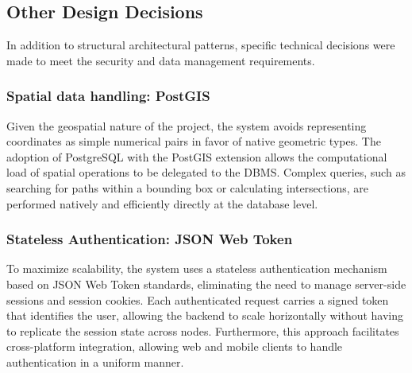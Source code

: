 \subsection{Other Design Decisions}
In addition to structural architectural patterns, specific technical decisions were made to meet the security and data management requirements.

\subsubsection{Spatial data handling: PostGIS}
Given the geospatial nature of the project, the system avoids representing coordinates as simple numerical pairs in favor of native geometric types. The adoption of PostgreSQL with the PostGIS extension allows the computational load of spatial operations to be delegated to the DBMS. Complex queries, such as searching for paths within a bounding box or calculating intersections, are performed natively and efficiently directly at the database level.

\subsubsection{Stateless Authentication: JSON Web Token}
To maximize scalability, the system uses a stateless authentication mechanism based on JSON Web Token standards, eliminating the need to manage server-side sessions and session cookies. Each authenticated request carries a signed token that identifies the user, allowing the backend to scale horizontally without having to replicate the session state across nodes. Furthermore, this approach facilitates cross-platform integration, allowing web and mobile clients to handle authentication in a uniform manner.